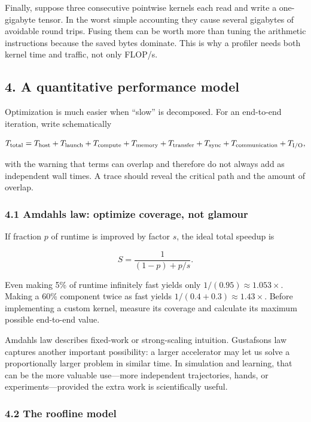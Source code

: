 \documentclass[
  10pt,
  letterpaper,
]{article}
\begin{document}
Finally, suppose three consecutive pointwise kernels each read and write
a one-gigabyte tensor. In the worst simple accounting they cause several
gigabytes of avoidable round trips. Fusing them can be worth more than
tuning the arithmetic instructions because the saved bytes dominate.
This is why a profiler needs both kernel time and traffic, not only
FLOP/s.

\subsection{4. A quantitative performance
model}\label{4-a-quantitative-performance-model}

Optimization is much easier when ``slow'' is decomposed. For an
end-to-end iteration, write schematically

\[
T_{\rm total}
=T_{\rm host}+T_{\rm launch}+T_{\rm compute}+T_{\rm memory}
+T_{\rm transfer}+T_{\rm sync}+T_{\rm communication}+T_{\rm I/O},
\]

with the warning that terms can overlap and therefore do not always add
as independent wall times. A trace should reveal the critical path and
the amount of overlap.

\subsubsection{4.1 Amdahl\textquotesingle s law: optimize coverage, not
glamour}\label{41-amdahls-law-optimize-coverage-not-glamour}

If fraction \(p\) of runtime is improved by factor \(s\), the ideal
total speedup is

\[
S=\frac{1}{(1-p)+p/s}.
\]

Even making 5\% of runtime infinitely fast yields only
\(1/(0.95)\approx1.053\times\). Making a 60\% component twice as fast
yields \(1/(0.4+0.3)\approx1.43\times\). Before implementing a custom
kernel, measure its coverage and calculate its maximum possible
end-to-end value.

Amdahl\textquotesingle s law describes fixed-work or strong-scaling
intuition. Gustafson\textquotesingle s law captures another important
possibility: a larger accelerator may let us solve a proportionally
larger problem in similar time. In simulation and learning, that can be
the more valuable use---more independent trajectories, hands, or
experiments---provided the extra work is scientifically useful.

\subsubsection{4.2 The roofline model}\label{42-the-roofline-model}
\end{document}
